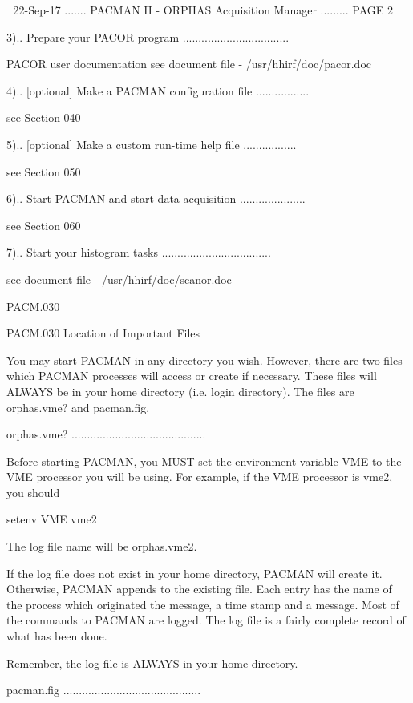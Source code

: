     
   22-Sep-17 ....... PACMAN II - ORPHAS Acquisition Manager ......... PAGE   2
 
       3).. Prepare your PACOR program ..................................
 
            PACOR user documentation
            see document file - /usr/hhirf/doc/pacor.doc
 
       4).. [optional] Make a PACMAN configuration file .................
 
            see Section 040
 
       5).. [optional] Make a custom run-time help file .................
 
            see Section 050
 
       6).. Start PACMAN and start data acquisition .....................
 
            see Section 060
 
       7).. Start your histogram tasks ...................................
 
            see document file - /usr/hhirf/doc/scanor.doc
 
 
   PACM.030
 
 
   PACM.030 Location of Important Files
 
   You  may  start  PACMAN  in any directory you wish.  However, there are two
   files which PACMAN processes will access  or  create  if  necessary.  These
   files  will  ALWAYS  be  in your home directory (i.e. login directory). The
   files are orphas.vme? and pacman.fig.
 
   orphas.vme? ...........................................
 
   Before starting PACMAN, you MUST set the environment variable  VME  to  the
   VME  processor  you  will  be  using.  For example, if the VME processor is
   vme2, you should
 
          setenv VME vme2
 
   The log file name will be orphas.vme2.
 
   If the log file does not exist in your home directory, PACMAN  will  create
   it.   Otherwise,  PACMAN  appends to the existing file.  Each entry has the
   name of the process which originated  the  message,  a  time  stamp  and  a
   message.   Most  of  the  commands to PACMAN are logged.  The log file is a
   fairly complete record of what has been done.
 
   Remember, the log file is ALWAYS in your home directory.
 
   pacman.fig ............................................
 
